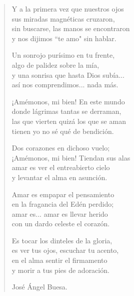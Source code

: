 \documentclass[11pt, portrait, twoside, notitlepage, openright]{book}
\begin{document}
\begin{verse}
Y a la primera vez que nuestros ojos\\
sus miradas magnéticas cruzaron,\\
sin buscarse, las manos se encontraron\\
y nos dijimos ``te amo" sin hablar.
\newline

Un sonrojo purísimo en tu frente,\\
algo de palidez sobre la mía,\\
y una sonrisa que hasta Dios subía...\\
así nos comprendimos... nada más.
\newline

¡Amémonos, mi bien! En este mundo\\
donde lágrimas tantas se derraman,\\
las que vierten quizá los que se aman\\
tienen yo no sé qué de bendición.
\newpage

Dos corazones en dichoso vuelo;\\
¡Amémonos, mi bien! Tiendan sus alas\\
amar es ver el entreabierto cielo\\
y levantar el alma en asunción.
\newline

Amar es empapar el pensamiento\\
en la fragancia del Edén perdido;\\
amar es... amar es llevar herido\\
con un dardo celeste el corazón.
\newline

Es tocar los dinteles de la gloria,\\
es ver tus ojos, escuchar tu acento,\\
en el alma sentir el firmamento\\
y morir a tus pies de adoración.
\newline

José Ángel Buesa.
\end{verse}
\end{document}
